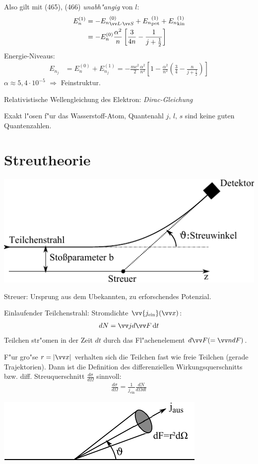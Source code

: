 \documentclass[a4paper]{scrartcl}
\newcommand{\dd}{\ensuremath \, \mathrm{d}}
\newcommand{\eqn}[1]{\begin{align} #1 \end{align}}
\newcommand{\spl}[1]{\begin{split} #1 \end{split}}
\begin{document}
Also gilt mit (465), (466) \emph{unabh"angig} von $l$:
\eqn{\spl{
E_n^{(1)} & = -{E_n}^{(0)}_{\vv L \cdot \vv S} + {E_n}_\mathrm{pot}^{(1)} + {E_n}_\mathrm{kin}^{(1)} \\
& = - E_n^{(0)} \frac{\alpha^2}n \left[ \frac3{4n} - \frac1{j+\frac12} \right]
}}
Energie-Niveaus:
\eqn{E_{n_j} & = E_n^{(0)} + E_{n_j}^{(1)} = - \frac{mc^2}{2} \frac{\alpha^2}{n^2} \left[ 1 - \frac{\alpha^2}{n^2} \left( \frac34 - \frac n{j+\frac12} \right) \right]}
$\alpha \approx 5,4 \cdot 10^{-5}$ $\Longrightarrow$ Feinstruktur.

Relativistische Wellengleichung des Elektron: \emph{Dirac-Gleichung}

Exakt l"osen f"ur das Wasserstoff-Atom, Quantenahl $j, \, l, \, s$ sind keine guten Quantenzahlen.

\section{Streutheorie}

\begin{center}
\includegraphics{469Streu}
\end{center}
Streuer: Ursprung aus dem Ubekannten, zu erforschendes Potenzial.

Einlaufender Teilchenstrahl: Stromdichte $\vv{j_\mathrm{ein}}(\vv x)$:
\eqn{ dN = \vv j d \vv F \dd t}
Teilchen str"omen in der Zeit $dt$ durch das Fl"achenelement $d \vv F ( = \vv n dF)$.

F"ur gro"se $r= \vert \vv x \vert$ verhalten sich die Teilchen fast wie freie Teilchen (gerade Trajektorien). Dann ist die Definition des differenziellen Wirkungsquerschnitts bzw. diff. Streuquerschnitt $\frac{d \sigma}{d \Omega}$ sinnvoll:
\eqn{ \frac{d\sigma}{d\Omega} = \frac1{j_\mathrm{ein}} \frac{dN}{d\Omega d t}}
\begin{center}
\includegraphics{470wirkquer}
\end{center}
\end{document}
